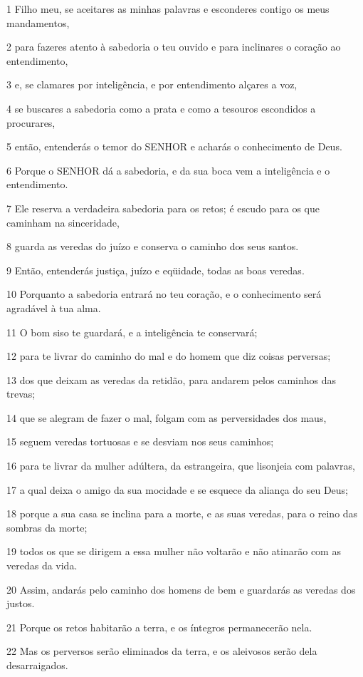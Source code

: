 \par 1 Filho meu, se aceitares as minhas palavras e esconderes contigo os meus mandamentos,
\par 2 para fazeres atento à sabedoria o teu ouvido e para inclinares o coração ao entendimento,
\par 3 e, se clamares por inteligência, e por entendimento alçares a voz,
\par 4 se buscares a sabedoria como a prata e como a tesouros escondidos a procurares,
\par 5 então, entenderás o temor do SENHOR e acharás o conhecimento de Deus.
\par 6 Porque o SENHOR dá a sabedoria, e da sua boca vem a inteligência e o entendimento.
\par 7 Ele reserva a verdadeira sabedoria para os retos; é escudo para os que caminham na sinceridade,
\par 8 guarda as veredas do juízo e conserva o caminho dos seus santos.
\par 9 Então, entenderás justiça, juízo e eqüidade, todas as boas veredas.
\par 10 Porquanto a sabedoria entrará no teu coração, e o conhecimento será agradável à tua alma.
\par 11 O bom siso te guardará, e a inteligência te conservará;
\par 12 para te livrar do caminho do mal e do homem que diz coisas perversas;
\par 13 dos que deixam as veredas da retidão, para andarem pelos caminhos das trevas;
\par 14 que se alegram de fazer o mal, folgam com as perversidades dos maus,
\par 15 seguem veredas tortuosas e se desviam nos seus caminhos;
\par 16 para te livrar da mulher adúltera, da estrangeira, que lisonjeia com palavras,
\par 17 a qual deixa o amigo da sua mocidade e se esquece da aliança do seu Deus;
\par 18 porque a sua casa se inclina para a morte, e as suas veredas, para o reino das sombras da morte;
\par 19 todos os que se dirigem a essa mulher não voltarão e não atinarão com as veredas da vida.
\par 20 Assim, andarás pelo caminho dos homens de bem e guardarás as veredas dos justos.
\par 21 Porque os retos habitarão a terra, e os íntegros permanecerão nela.
\par 22 Mas os perversos serão eliminados da terra, e os aleivosos serão dela desarraigados.

